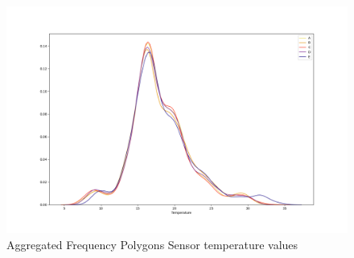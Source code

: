 \documentclass[a4paper]{article}
\begin{document}
\begin{figure}[H]
\includegraphics[width=17cm]{images/a1_5.png}
\centering
\caption{Aggregated Frequency Polygons Sensor temperature values }
\end{figure}
\end{document}
